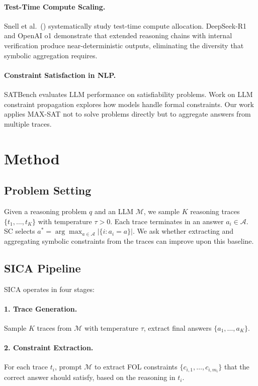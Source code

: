 \documentclass[11pt,a4paper]{article}
\begin{document}
\paragraph{Test-Time Compute Scaling.}
Snell et al.\ (\citeyear{snell2025scaling}) systematically study test-time compute allocation. DeepSeek-R1 and OpenAI o1 demonstrate that extended reasoning chains with internal verification produce near-deterministic outputs, eliminating the diversity that symbolic aggregation requires.

\paragraph{Constraint Satisfaction in NLP.}
SATBench evaluates LLM performance on satisfiability problems. Work on LLM constraint propagation explores how models handle formal constraints. Our work applies MAX-SAT not to solve problems directly but to aggregate answers from multiple traces.

\section{Method}

\subsection{Problem Setting}

Given a reasoning problem $q$ and an LLM $\mathcal{M}$, we sample $K$ reasoning traces $\{t_1, \ldots, t_K\}$ with temperature $\tau > 0$. Each trace terminates in an answer $a_i \in \mathcal{A}$. SC selects $a^* = \arg\max_{a \in \mathcal{A}} |\{i : a_i = a\}|$. We ask whether extracting and aggregating symbolic constraints from the traces can improve upon this baseline.

\subsection{SICA Pipeline}

SICA operates in four stages:

\paragraph{1. Trace Generation.} Sample $K$ traces from $\mathcal{M}$ with temperature $\tau$, extract final answers $\{a_1, \ldots, a_K\}$.

\paragraph{2. Constraint Extraction.} For each trace $t_i$, prompt $\mathcal{M}$ to extract FOL constraints $\{c_{i,1}, \ldots, c_{i,m_i}\}$ that the correct answer should satisfy, based on the reasoning in $t_i$.
\end{document}

